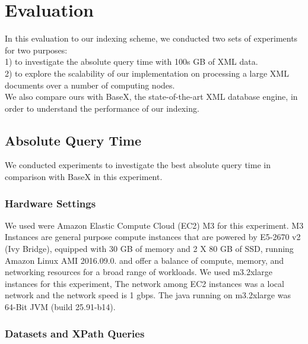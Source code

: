 \section{Evaluation}
\label{sec:evaluation}

In this evaluation to our indexing scheme, we conducted two sets of experiments
for two purposes: \\ 
1) to investigate the absolute query time with 100s GB of XML data.\\ 
2) to explore the scalability of our implementation on processing  a large XML 
documents over a number of computing nodes.\\ 
We also compare ours with BaseX,  the state-of-the-art XML database engine, in
order to understand the performance of our indexing.

\subsection{Absolute Query Time} 

We conducted experiments to investigate the best absolute query time in
comparison with BaseX in this experiment.

\subsubsection{Hardware Settings}

We used were Amazon Elastic Compute Cloud (EC2) M3 for this experiment. M3
Instances are general purpose compute instances that are powered by E5-2670 v2
(Ivy Bridge), equipped with 30 GB of memory and 2 X 80 GB of SSD, running Amazon
Linux AMI 2016.09.0. and offer a balance of compute, memory, and networking
resources for a broad range of workloads. We used m3.2xlarge instances for this
experiment, The network among EC2 instances was a local network and the network
speed is 1 gbps. The java running on m3.2xlarge was 64-Bit JVM (build
25.91-b14).

\subsubsection{Datasets and XPath Queries}

